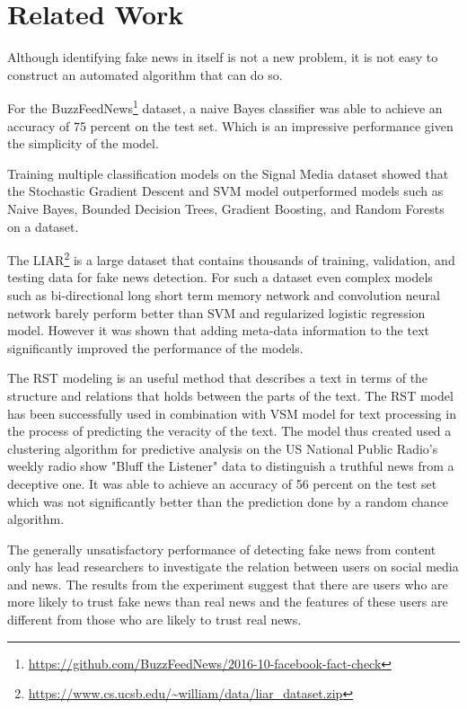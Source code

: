 \section{Related Work} \label{related_works}
Although identifying fake news in itself is not a new problem, it is not easy to construct an automated algorithm that can do so\cite{shu2017fake}.

For the BuzzFeedNews\footnote{\url{https://github.com/BuzzFeedNews/2016-10-facebook-fact-check}} dataset, a naive Bayes classifier was able to achieve an accuracy of 75 percent on the test set\cite{granik2017fake}. Which is an impressive performance given the simplicity of the model. 

Training multiple classification models on the Signal Media dataset showed that the Stochastic Gradient Descent and SVM model outperformed models such as Naive Bayes, Bounded Decision Trees, Gradient Boosting, and Random Forests \cite{gilda2017evaluating} on a dataset.

The LIAR\footnote{\url{https://www.cs.ucsb.edu/~william/data/liar_dataset.zip}} is a large dataset that contains thousands of training, validation, and testing data for fake news detection. For such a dataset even complex models such as bi-directional long short term memory network and convolution neural network barely perform better than SVM and regularized logistic regression model\cite{wang2017liar}. However it was shown that adding meta-data information to the text significantly improved the performance of the models\cite{wang2017liar}.

The RST\cite{mann1988rhetorical} modeling is an useful method that describes a text in terms of the structure and relations that holds between the parts of the text. The RST model has been successfully used in combination with VSM model for text processing in the process of predicting the veracity of the text\cite{rubin2015towards}. The model thus created used a clustering algorithm for predictive analysis on the US National Public Radio's weekly radio show "Bluff the Listener" data to distinguish a truthful news from a deceptive one. It was able to achieve an accuracy of 56 percent on the test set which was not significantly better than the prediction done by a random chance algorithm\cite{rubin2015towards}.

The generally unsatisfactory performance of detecting fake news from content only has lead researchers to investigate the relation between users on social media and news. The results from the experiment suggest that there are users who are more likely to trust fake news than real news and the features of these users are different from those who are likely to trust real news\cite{shu2018understanding}.

